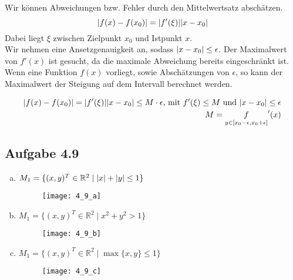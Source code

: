 \documentclass{standalone}
\begin{document}
Wir können Abweichungen bzw. Fehler durch den Mittelwertsatz abschätzen.
$$\lvert f(x) - f(x_0)\rvert=\lvert f'(\xi)\rvert\lvert x-x_0\rvert$$
Dabei liegt $\xi$ zwischen Zielpunkt $x_0$ und Istpunkt $x$. \\
Wir nehmen eine Ansetzgenauigkeit an, sodass $\lvert x-x_0\rvert \leq \epsilon$.
Der Maximalwert von $f'(x)$ ist gesucht, da die maximale Abweichung bereits eingeschränkt ist.
Wenn eine Funktion $f(x)$ vorliegt, sowie Abschätzungen von $\epsilon$, so kann der Maximalwert der Steigung auf dem Intervall berechnet werden.

\begin{align}
    \lvert f(x) - f(x_0)\rvert = \lvert f'(\xi)\rvert\lvert x-x_0\rvert \leq M\cdot\epsilon \text{, mit } f'(\xi) \leq M \text{ und } \lvert x-x_0\rvert \leq \epsilon \\
    M=\underset{y \in [x_0 - \epsilon, x_0 + \epsilon]} f'(x)
\end{align}

\subsection{Aufgabe 4.9}

\begin{enumerate}[a)]
    \item $M_1 = \{ (x,y)^T \in \mathbb{R}^2 \mid \lvert x\rvert + \lvert y\rvert \leq 1 \}$
    \begin{figure}[htbp]
        \centering
        \texttt{[image: 4\_9\_a]}
    \end{figure}
    \FloatBarrier

    \item $M_1 = \{ (x,y)^T \in \mathbb{R}^2 \mid x^2 + y^2 > 1 \}$
    \begin{figure}[htbp]
        \centering
        \texttt{[image: 4\_9\_b]}
    \end{figure}
    \FloatBarrier
    
    \item $M_1 = \{ (x,y)^T \in \mathbb{R}^2 \mid \max\{x,y\} \leq 1 \}$
    \begin{figure}[htbp]
        \centering
        \texttt{[image: 4\_9\_c]}
    \end{figure}
    \FloatBarrier
\end{enumerate}
\end{document}
